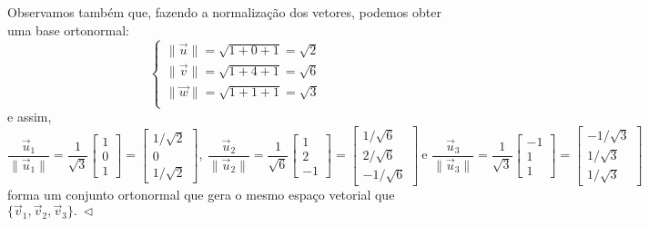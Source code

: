\documentclass[../livro.tex]{subfiles}  %
\begin{document}
\begin{example}
Observamos também que, fazendo a normalização dos vetores, podemos obter uma base ortonormal:
\begin{equation}
\left\{
  \begin{array}{ll}
   \|\vec{u}\| = \sqrt{1 + 0 + 1} = \sqrt{2} \\
   \|\vec{v}\| = \sqrt{1 + 4 + 1} = \sqrt{6} \\
   \|\vec{w}\| = \sqrt{1 + 1 + 1} = \sqrt{3} \\
  \end{array}
\right.
\end{equation} e assim,
\begin{equation}
\frac{\vec{u}_1}{\|\vec{u}_1\|} = \frac{1}{\sqrt{3}}
\begin{bmatrix}
1 \\ 0 \\ 1
\end{bmatrix} =
\begin{bmatrix}
1/\sqrt{2} \\ 0 \\ 1/\sqrt{2}
\end{bmatrix}, \
\frac{\vec{u}_2}{\|\vec{u}_2\|} = \frac{1}{\sqrt{6}}
\begin{bmatrix}
1 \\ 2 \\ -1
\end{bmatrix} =
\begin{bmatrix}
1/\sqrt{6} \\ 2/\sqrt{6} \\ -1/\sqrt{6}
\end{bmatrix} \ \text{e }
\frac{\vec{u}_3}{\|\vec{u}_3\|} = \frac{1}{\sqrt{3}}
\begin{bmatrix}
-1 \\ 1 \\ 1
\end{bmatrix} =
\begin{bmatrix}
-1/\sqrt{3} \\ 1/\sqrt{3} \\ 1/\sqrt{3}
\end{bmatrix}
\end{equation} forma um conjunto ortonormal que gera o mesmo espaço vetorial que $\{ \vec{v}_1, \vec{v}_2, \vec{v}_3 \}. \ \lhd$
\end{example}
\end{document}
